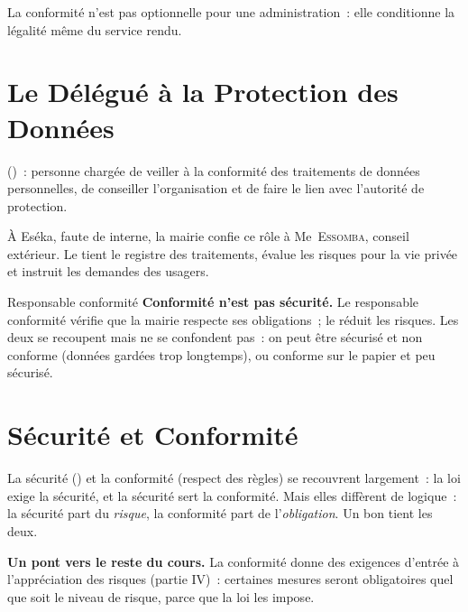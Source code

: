 La conformité n'est pas optionnelle pour une administration~: elle conditionne
la légalité même du service rendu.

\section{Le Délégué à la Protection des Données}
\label{sec:c06-dpo}

\begin{boxdef}
 ()~: personne chargée
de veiller à la conformité des traitements de données personnelles, de
conseiller l'organisation et de faire le lien avec l'autorité de protection.
\end{boxdef}

À Eséka, faute de  interne, la mairie confie ce rôle à
Me~\textsc{Essomba}, conseil extérieur. Le  tient le registre des
traitements, évalue les risques pour la vie privée et instruit les demandes des
usagers.

\begin{boxmetier}{Responsable conformité}
\textbf{Conformité n'est pas sécurité.} Le responsable conformité vérifie que
la mairie respecte ses obligations~; le  réduit les risques. Les
deux se recoupent mais ne se confondent pas~: on peut être sécurisé et non
conforme (données gardées trop longtemps), ou conforme sur le papier et peu
sécurisé.
\end{boxmetier}

\section{Sécurité et Conformité}
\label{sec:c06-recouvrement}

La sécurité () et la conformité (respect des règles) se recouvrent
largement~: la loi exige la sécurité, et la sécurité sert la conformité. Mais
elles diffèrent de logique~: la sécurité part du \emph{risque}, la conformité
part de l'\emph{obligation}. Un bon  tient les deux.

\begin{boxinfo}
\textbf{Un pont vers le reste du cours.} La conformité donne des exigences
d'entrée à l'appréciation des risques (partie IV)~: certaines mesures seront
obligatoires quel que soit le niveau de risque, parce que la loi les impose.
\end{boxinfo}

